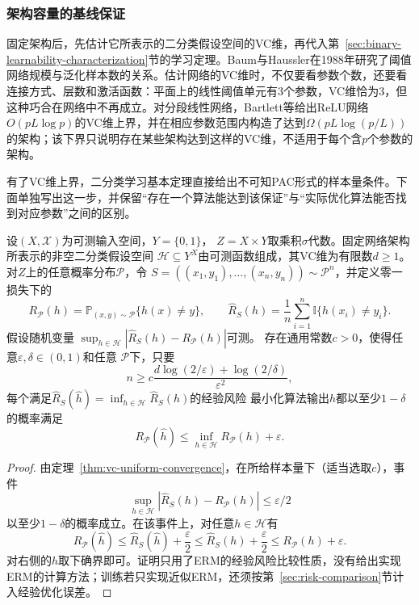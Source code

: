 \subsubsection{架构容量的基线保证}

固定架构后，先估计它所表示的二分类假设空间的VC维，再代入第~\ref{sec:binary-learnability-characterization}节的学习定理。Baum与Haussler在1988年研究了阈值网络规模与泛化样本数的关系。估计网络的VC维时，不仅要看参数个数，还要看连接方式、层数和激活函数：平面上的线性阈值单元有3个参数，VC维恰为3，但这种巧合在网络中不再成立。对分段线性网络，Bartlett等给出ReLU网络$O(pL\log p)$的VC维上界，并在相应参数范围内构造了达到$\Omega(pL\log(p/L))$的架构；该下界只说明存在某些架构达到这样的VC维，不适用于每个含$p$个参数的架构。

有了VC维上界，二分类学习基本定理直接给出不可知PAC形式的样本量条件。下面单独写出这一步，并保留“存在一个算法能达到该保证”与“实际优化算法能否找到对应参数”之间的区别。

\begin{theorem}[有限VC维网络的不可知PAC样本量保证]
\label{thm:network-vc-pac}
设$(X,\mathcal X)$为可测输入空间，$Y=\{0,1\}$，
$Z=X\times Y$取乘积$\sigma$代数。固定网络架构所表示的非空二分类假设空间
$\mathcal H\subseteq Y^X$由可测函数组成，其VC维为有限数$d\geq1$。
对$Z$上的任意概率分布$\mathcal P$，令
$S=((x_1,y_1),\ldots,(x_n,y_n))\sim\mathcal P^n$，并定义零一损失下的
\[
 R_{\mathcal P}(h)=\mathbb P_{(x,y)\sim\mathcal P}\{h(x)\neq y\},
 \qquad
 \hat R_S(h)=\frac1n\sum_{i=1}^n\mathbb I\{h(x_i)\neq y_i\}.
\]
假设随机变量
$\sup_{h\in\mathcal H}|\hat R_S(h)-R_{\mathcal P}(h)|$可测。
存在通用常数$c>0$，使得任意$\varepsilon,\delta\in(0,1)$和任意
$\mathcal P$下，只要
\[
 n\geq c\frac{d\log(2/\varepsilon)+\log(2/\delta)}{\varepsilon^2},
\]
每个满足$\hat R_S(\hat h)=\inf_{h\in\mathcal H}\hat R_S(h)$的经验风险
最小化算法输出$\hat h$都以至少$1-\delta$的概率满足
\[
 R_{\mathcal P}(\hat h)\leq\inf_{h\in\mathcal H}R_{\mathcal P}(h)+\varepsilon.
\]
\end{theorem}
\begin{proof}
由定理~\ref{thm:vc-uniform-convergence}，在所给样本量下（适当选取$c$），事件
\[
 \sup_{h\in\mathcal H}|\hat R_S(h)-R_{\mathcal P}(h)|\leq\varepsilon/2
\]
以至少$1-\delta$的概率成立。在该事件上，对任意$h\in\mathcal H$有
\[
 R_{\mathcal P}(\hat h)
 \leq\hat R_S(\hat h)+\frac\varepsilon2
 \leq\hat R_S(h)+\frac\varepsilon2
 \leq R_{\mathcal P}(h)+\varepsilon.
\]
对右侧的$h$取下确界即可。证明只用了ERM的经验风险比较性质，没有给出实现ERM的计算方法；训练若只实现近似ERM，还须按第~\ref{sec:risk-comparison}节计入经验优化误差。
\end{proof}

